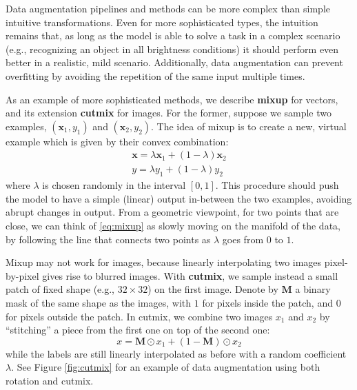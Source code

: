 Data augmentation pipelines and methods can be more complex than simple intuitive transformations. Even for more sophisticated types, the intuition remains that, as long as the model is able to solve a task in a complex scenario (e.g., recognizing an object in all brightness conditions) it should perform even better in a realistic, mild scenario. Additionally, data augmentation can prevent overfitting by avoiding the repetition of the same input multiple times.

As an example of more sophisticated methods, we describe \textbf{mixup} \cite{zhang2017mixup} for vectors, and its extension \textbf{cutmix} \cite{yun2019cutmix} for images. For the former, suppose we sample two examples, $(\mathbf{x}_1, y_1)$ and $(\mathbf{x}_2, y_2)$. The idea of mixup is to create a new, virtual example which is given by their convex combination:
%
\begin{gather}
\mathbf{x}=\lambda\mathbf{x}_1+(1-\lambda)\mathbf{x}_2\\y=\lambda y_1+(1-\lambda)y_2
\label{eq:mixup}
\end{gather}
%
where $\lambda$ is chosen randomly in the interval $[0,1]$. This procedure should push the model to have a simple (linear) output in-between the two examples, avoiding abrupt changes in output. From a geometric viewpoint, for two points that are close, we can think of \eqref{eq:mixup} as slowly moving on the manifold of the data, by following the line that connects two points as $\lambda$ goes from $0$ to $1$.

Mixup may not work for images, because linearly interpolating two images pixel-by-pixel gives rise to blurred images. With \textbf{cutmix}, we sample instead a small patch of fixed shape (e.g., $32 \times 32$) on the first image. Denote by $\mathbf{M}$ a binary mask of the same shape as the images, with $1$ for pixels inside the patch, and $0$ for pixels outside the patch. In cutmix, we combine two images $x_1$ and $x_2$ by “stitching” a piece from the first one on top of the second one:
%
$$
x=\mathbf{M}\odot x_1+(1-\mathbf{M})\odot x_2
$$
%
while the labels are still linearly interpolated as before with a random coefficient $\lambda$. See Figure \ref{fig:cutmix} for an example of data augmentation using both rotation and cutmix.

